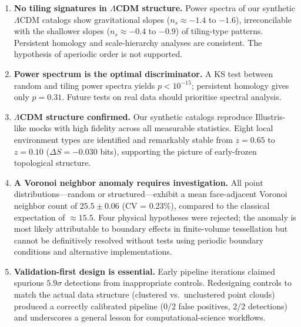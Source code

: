 \documentclass[12pt,a4paper]{article}
\begin{document}
\begin{enumerate}
  \item \textbf{No tiling signatures in $\Lambda$CDM structure.}  Power spectra
        of our synthetic $\Lambda$CDM catalogs show gravitational slopes
        ($n_s \approx -1.4$ to $-1.6$), irreconcilable with the shallower slopes
        ($n_s \approx -0.4$ to $-0.9$) of tiling-type patterns.  Persistent
        homology and scale-hierarchy analyses are consistent.  The hypothesis of
        aperiodic order is not supported.

  \item \textbf{Power spectrum is the optimal discriminator.}  A KS test between
        random and tiling power spectra yields $p < 10^{-15}$; persistent
        homology gives only $p = 0.31$.  Future tests on real data should
        prioritise spectral analysis.

  \item \textbf{$\Lambda$CDM structure confirmed.}  Our synthetic catalogs
        reproduce Illustris-like mocks with high fidelity across all measurable
        statistics.  Eight local environment types are identified and
        remarkably stable from $z = 0.65$ to $z = 0.10$ ($\Delta S = -0.030$
        bits), supporting the picture of early-frozen topological structure.

  \item \textbf{A Voronoi neighbor anomaly requires investigation.}  All point
        distributions---random or structured---exhibit a mean face-adjacent
        Voronoi neighbor count of $25.5 \pm 0.06$ (CV = 0.23\%), compared to
        the classical expectation of $\approx 15.5$.  Four physical hypotheses
        were rejected; the anomaly is most likely attributable to boundary
        effects in finite-volume tessellation but cannot be definitively resolved
        without tests using periodic boundary conditions and alternative
        implementations.

  \item \textbf{Validation-first design is essential.}  Early pipeline
        iterations claimed spurious $5.9\sigma$ detections from inappropriate
        controls.  Redesigning controls to match the actual data structure
        (clustered vs.\ unclustered point clouds) produced a correctly calibrated
        pipeline (0/2 false positives, 2/2 detections) and underscores a general
        lesson for computational-science workflows.
\end{enumerate}
\end{document}

